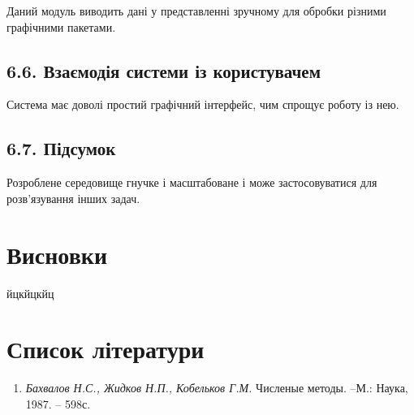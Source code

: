 Даний модуль виводить дані у представленні зручному для обробки різними
графічними пакетами.

\hypertarget{ux432ux437ux430ux454ux43cux43eux434ux456ux44f-ux441ux438ux441ux442ux435ux43cux438-ux456ux437-ux43aux43eux440ux438ux441ux442ux443ux432ux430ux447ux435ux43c}{%
\subsection[6.6. Взаємодія системи із
користувачем]{\texorpdfstring{\protect\hypertarget{anchor-72}{}{}6.6.
Взаємодія системи із
користувачем}{6.6. Взаємодія системи із користувачем}}\label{ux432ux437ux430ux454ux43cux43eux434ux456ux44f-ux441ux438ux441ux442ux435ux43cux438-ux456ux437-ux43aux43eux440ux438ux441ux442ux443ux432ux430ux447ux435ux43c}}

Система має доволі простий графічний інтерфейс, чим спрощує роботу із
нею.

\hypertarget{ux43fux456ux434ux441ux443ux43cux43eux43a-4}{%
\subsection[6.7.
Підсумок]{\texorpdfstring{\protect\hypertarget{anchor-73}{}{}6.7.
Підсумок}{6.7. Підсумок}}\label{ux43fux456ux434ux441ux443ux43cux43eux43a-4}}

Розроблене середовище гнучке і масштабоване і може застосовуватися для
розв'язування інших задач.

\hypertarget{ux432ux438ux441ux43dux43eux432ux43aux438}{%
\section[Висновки]{\texorpdfstring{\protect\hypertarget{anchor-74}{}{}Висновки}{Висновки}}\label{ux432ux438ux441ux43dux43eux432ux43aux438}}

йцкйцкйц

\hypertarget{ux441ux43fux438ux441ux43eux43a-ux43bux456ux442ux435ux440ux430ux442ux443ux440ux438}{%
\section[Список
літератури]{\texorpdfstring{\protect\hypertarget{anchor-75}{}{}Список
літератури}{Список літератури}}\label{ux441ux43fux438ux441ux43eux43a-ux43bux456ux442ux435ux440ux430ux442ux443ux440ux438}}

\begin{enumerate}
\def\labelenumi{\arabic{enumi}.}
\tightlist
\item
  \emph{Бахвалов Н.С., Жидков Н.П., Кобельков Г.М. }Численые методы.
  --М.: Наука, 1987. -- 598с.
\end{enumerate}

